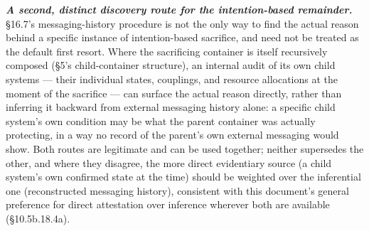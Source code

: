 \documentclass[
]{article}
\begin{document}
\emph{\textbf{A second, distinct discovery route for the intention-based
remainder.}} §16.7's messaging-history procedure is not the only way to
find the actual reason behind a specific instance of intention-based
sacrifice, and need not be treated as the default first resort. Where
the sacrificing container is itself recursively composed (§5's
child-container structure), an internal audit of its own child systems
--- their individual states, couplings, and resource allocations at the
moment of the sacrifice --- can surface the actual reason directly,
rather than inferring it backward from external messaging history alone:
a specific child system's own condition may be what the parent container
was actually protecting, in a way no record of the parent's own external
messaging would show. Both routes are legitimate and can be used
together; neither supersedes the other, and where they disagree, the
more direct evidentiary source (a child system's own confirmed state at
the time) should be weighted over the inferential one (reconstructed
messaging history), consistent with this document's general preference
for direct attestation over inference wherever both are available
(§10.5b.18.4a).
\end{document}
